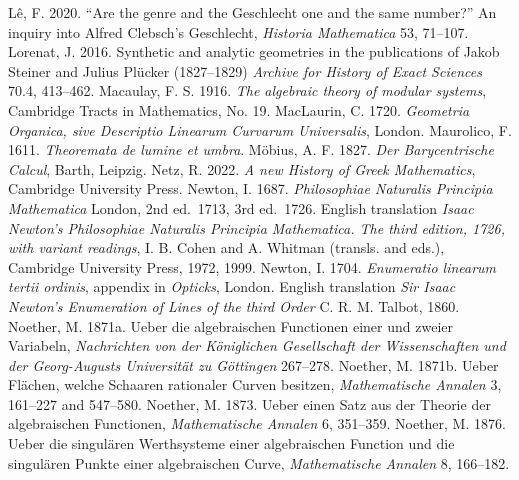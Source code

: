  \newline\indent L\^e, F. 2020. ``Are the genre and the Geschlecht one and the same number?'' An inquiry into Alfred Clebsch's Geschlecht, \emph{Historia Mathematica} 53, 71--107.
 \newline\indent Lorenat, J. 2016. Synthetic and analytic geometries in the publications of Jakob Steiner and Julius Pl\"ucker (1827--1829) \emph{Archive for History of Exact Sciences}  70.4, 413--462.
 \newline\indent Macaulay, F. S.  1916.  \emph{The algebraic theory of modular systems},  Cambridge Tracts in Mathematics, No. 19.
\newline\indent  MacLaurin, C. 1720.  \emph{Geometria Organica, sive Descriptio Linearum Curvarum Universalis}, London.
 \newline\indent Maurolico, F. 1611. \emph{Theoremata de lumine et umbra}. 
 \newline\indent M\"obius, A. F. 1827. \emph{Der Barycentrische Calcul}, Barth, Leipzig.
 \newline\indent  Netz, R. 2022. \emph{A new History of Greek Mathematics}, Cambridge University Press.
\newline\indent Newton, I. 1687. \emph{Philosophiae  Naturalis Principia Mathematica} London, 2nd ed.\ 1713, 3rd ed.\ 1726. English translation \emph{Isaac Newton's Philosophiae Naturalis Principia Mathematica. The third edition, 1726, with variant readings}, I. B. Cohen and A. Whitman (transls. and eds.), Cambridge University Press, 1972, 1999.
\newline\indent Newton, I. 1704. \emph{Enumeratio linearum tertii ordinis}, appendix in \emph{Opticks}, London. English translation \emph{Sir Isaac Newton's Enumeration of Lines of the third Order} C. R. M. Talbot, 1860.
\newline\indent Noether, M. 1871a. Ueber die algebraischen Functionen einer und zweier Variabeln, \emph{Nachrichten von der K\"oniglichen Gesellschaft der Wissenschaften und der Georg-Au\-gusts Universit\"at zu G\"ottingen} 267--278.
\newline\indent Noether, M. 1871b. Ueber Fl\"achen, welche Schaaren rationaler Curven besitzen, \emph{Mathematische  Annalen} 3,   161--227 and 547--580.
\newline\indent Noether, M. 1873. Ueber einen Satz aus der Theorie der algebraischen Functionen, \emph{Mathematische Annalen} 6, 351--359.
\newline\indent Noether, M. 1876.  Ueber die singul\"aren Werthsysteme einer algebraischen Function und die singul\"aren Punkte einer algebraischen Curve, \emph{Mathematische  Annalen} 8, 166--182.
